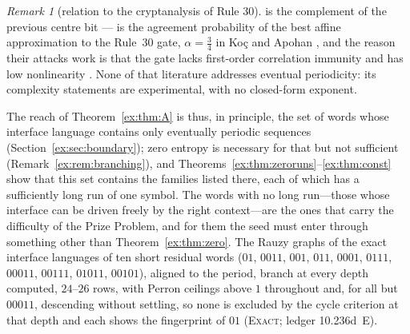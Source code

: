 \documentclass[11pt]{article}
\theoremstyle{definition}
\theoremstyle{remark}
\newtheorem{remark}[theorem]{Remark}
\newcommand{\EXACT}{\textsc{Exact}}
\begin{document}
\begin{remark}[relation to the cryptanalysis of Rule 30]
is the complement of the previous centre bit --- is the agreement probability of the best affine approximation
to the Rule~30 gate, $\alpha=\tfrac34$ in Ko\c{c} and Apohan \cite{KA}, and the reason their attacks work is
that the gate lacks first-order correlation immunity and has low nonlinearity \cite{Mariot}. None of that
literature addresses eventual periodicity: its complexity statements are experimental, with no closed-form
exponent.
\end{remark}


The reach of Theorem~\ref{ex:thm:A} is thus, in principle, the set of words whose interface language contains only eventually periodic sequences (Section~\ref{ex:sec:boundary}); zero entropy is necessary for that but not sufficient (Remark~\ref{ex:rem:branching}), and Theorems~\ref{ex:thm:zeroruns}--\ref{ex:thm:const} show that this set contains the families listed there, each of which has a sufficiently long run of one symbol. The words with no long run---those whose interface can be driven freely by the right context---are the ones that carry the difficulty of the Prize Problem, and for them the seed must enter through something other than Theorem~\ref{ex:thm:zero}. The Rauzy graphs of the exact interface languages of ten short residual words ($01$, $0011$, $001$, $011$, $0001$, $0111$, $00011$, $00111$, $01011$, $00101$), aligned to the period, branch at every depth computed, $24$--$26$ rows, with Perron ceilings above $1$ throughout and, for all but $00011$, descending without settling, so none is excluded by the cycle criterion at that depth and each shows the fingerprint of $01$ (\EXACT; ledger 10.236d~E).
\end{document}
